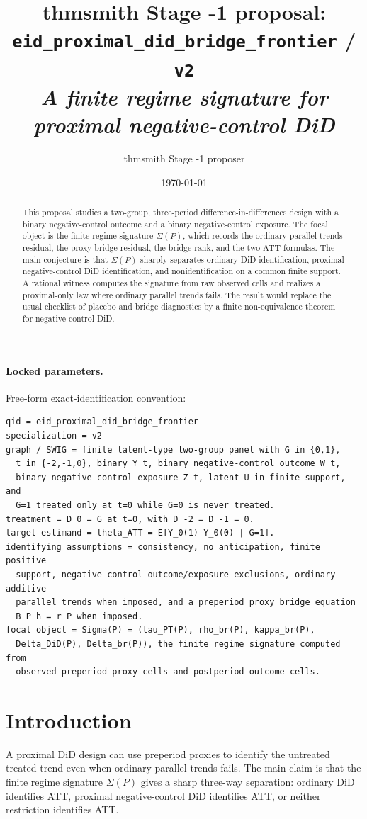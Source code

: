 \documentclass[11pt]{article}
\title{thmsmith Stage -1 proposal: \texttt{eid\_proximal\_did\_bridge\_frontier} / \texttt{v2}%
  \\ \large\textit{A finite regime signature for proximal negative-control DiD}}
\author{thmsmith Stage -1 proposer}
\date{\today}
\theoremstyle{definition}
\theoremstyle{plain}
\theoremstyle{remark}
\begin{document}
\maketitle


\paragraph{Locked parameters.}
Free-form exact-identification convention:
\begin{verbatim}
qid = eid_proximal_did_bridge_frontier
specialization = v2
graph / SWIG = finite latent-type two-group panel with G in {0,1},
  t in {-2,-1,0}, binary Y_t, binary negative-control outcome W_t,
  binary negative-control exposure Z_t, latent U in finite support, and
  G=1 treated only at t=0 while G=0 is never treated.
treatment = D_0 = G at t=0, with D_-2 = D_-1 = 0.
target estimand = theta_ATT = E[Y_0(1)-Y_0(0) | G=1].
identifying assumptions = consistency, no anticipation, finite positive
  support, negative-control outcome/exposure exclusions, ordinary additive
  parallel trends when imposed, and a preperiod proxy bridge equation
  B_P h = r_P when imposed.
focal object = Sigma(P) = (tau_PT(P), rho_br(P), kappa_br(P),
  Delta_DiD(P), Delta_br(P)), the finite regime signature computed from
  observed preperiod proxy cells and postperiod outcome cells.
\end{verbatim}

\begin{abstract}
This proposal studies a two-group, three-period difference-in-differences design with a binary negative-control outcome and a binary negative-control exposure. The focal object is the finite regime signature \(\Sigma(P)\), which records the ordinary parallel-trends residual, the proxy-bridge residual, the bridge rank, and the two ATT formulas. The main conjecture is that \(\Sigma(P)\) sharply separates ordinary DiD identification, proximal negative-control DiD identification, and nonidentification on a common finite support. A rational witness computes the signature from raw observed cells and realizes a proximal-only law where ordinary parallel trends fails. The result would replace the usual checklist of placebo and bridge diagnostics by a finite non-equivalence theorem for negative-control DiD.
\end{abstract}

\section{Introduction}
A proximal DiD design can use preperiod proxies to identify the untreated treated trend even when ordinary parallel trends fails. The main claim is that the finite regime signature \(\Sigma(P)\) gives a sharp three-way separation: ordinary DiD identifies ATT, proximal negative-control DiD identifies ATT, or neither restriction identifies ATT.
\end{document}
